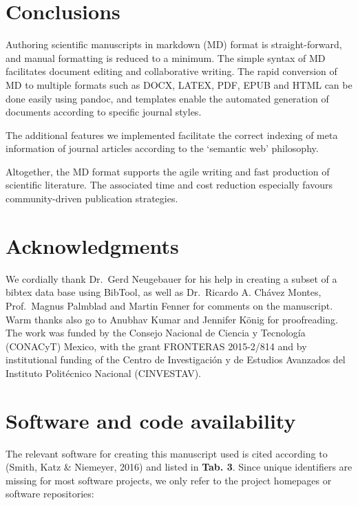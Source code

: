 \documentclass[10pt,fleqn]{wlpeerj}
\begin{document}
\section{Conclusions}\label{conclusions}

Authoring scientific manuscripts in markdown (MD) format is
straight-forward, and manual formatting is reduced to a minimum. The
simple syntax of MD facilitates document editing and collaborative
writing. The rapid conversion of MD to multiple formats such as DOCX,
LATEX, PDF, EPUB and HTML can be done easily using pandoc, and templates
enable the automated generation of documents according to specific
journal styles.

The additional features we implemented facilitate the correct indexing
of meta information of journal articles according to the `semantic web'
philosophy.

Altogether, the MD format supports the agile writing and fast production
of scientific literature. The associated time and cost reduction
especially favours community-driven publication strategies.

\section{Acknowledgments}\label{acknowledgments}

We cordially thank Dr.~Gerd Neugebauer for his help in creating a subset
of a bibtex data base using BibTool, as well as Dr.~Ricardo A. Chávez
Montes, Prof.~Magnus Palmblad and Martin Fenner for comments on the
manuscript. Warm thanks also go to Anubhav Kumar and Jennifer König for
proofreading. The work was funded by the Consejo Nacional de Ciencia y
Tecnología (CONACyT) Mexico, with the grant FRONTERAS 2015-2/814 and by
institutional funding of the Centro de Investigación y de Estudios
Avanzados del Instituto Politécnico Nacional (CINVESTAV).

\newpage

\section{Software and code
availability}\label{software-and-code-availability}

The relevant software for creating this manuscript used is cited
according to (Smith, Katz \& Niemeyer, 2016) and listed in \textbf{Tab.
3}. Since unique identifiers are missing for most software projects, we
only refer to the project homepages or software repositories:
\end{document}
